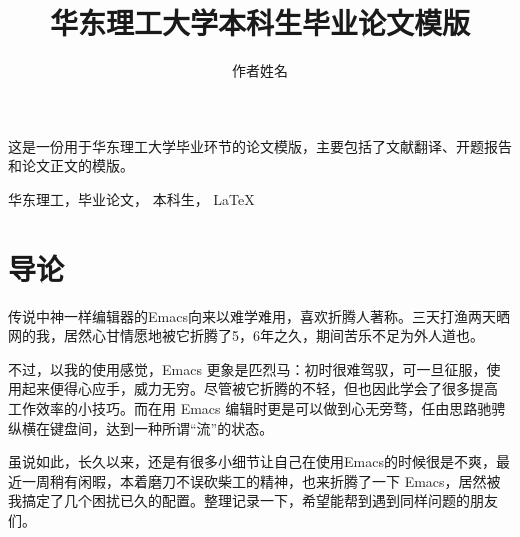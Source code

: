 \documentclass[openning]{ecustthsis}
\author{作者姓名}
\title{华东理工大学本科生毕业论文模版}
\begin{document}

\maketitle


\ECUSTabstract
这是一份用于华东理工大学毕业环节的论文模版，主要包括了文献翻译、开题报告和论文正文的模版。

\ECUSTkeywords
华东理工，毕业论文， 本科生， \LaTeX


\section{导论}

传说中神一样编辑器的Emacs向来以难学难用，喜欢折腾人著称。三天打渔两天晒
网的我，居然心甘情愿地被它折腾了5，6年之久，期间苦乐不足为外人道也。

不过，以我的使用感觉，Emacs 更象是匹烈马：初时很难驾驭，可一旦征服，使
用起来便得心应手，威力无穷。尽管被它折腾的不轻，但也因此学会了很多提高
工作效率的小技巧。而在用 Emacs 编辑时更是可以做到心无旁骛，任由思路驰骋
纵横在键盘间，达到一种所谓“流”的状态。

虽说如此，长久以来，还是有很多小细节让自己在使用Emacs的时候很是不爽，最
近一周稍有闲暇，本着磨刀不误砍柴工的精神，也来折腾了一下 Emacs，居然被
我搞定了几个困扰已久的配置。整理记录一下，希望能帮到遇到同样问题的朋友
们。
\end{document}
